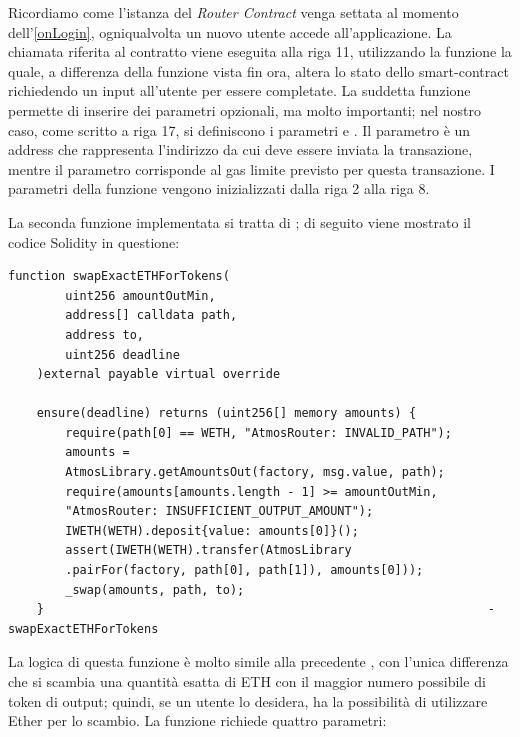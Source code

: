 Ricordiamo come l'istanza del \textit{Router Contract} venga settata al momento dell'\ref{onLogin}, ogniqualvolta un nuovo utente accede all'applicazione. La chiamata riferita al contratto viene eseguita alla riga 11, utilizzando la funzione  la quale, a differenza della funzione  vista fin ora, altera lo stato dello smart-contract richiedendo un input all'utente per essere completate.
La suddetta funzione permette di inserire dei parametri opzionali, ma molto importanti; nel nostro caso, come scritto a riga 17, si definiscono i parametri  e .
Il parametro  è un address che rappresenta l'indirizzo da cui deve essere inviata la transazione, mentre il parametro  corrisponde al gas limite previsto per questa transazione. 
I parametri della funzione  vengono inizializzati dalla riga 2 alla riga 8.


La seconda funzione implementata si tratta di  \textcourier{\ref{swapExactETHForTokens}}; di seguito viene mostrato il codice Solidity in questione:\\

\begin{lstlisting}[caption={[\textcourier{swapExactETHForTokens()} Function]},language=Solidity] 
function swapExactETHForTokens(
        uint256 amountOutMin,
        address[] calldata path,
        address to,
        uint256 deadline
    )external payable virtual override 
    
    ensure(deadline) returns (uint256[] memory amounts) {
        require(path[0] == WETH, "AtmosRouter: INVALID_PATH");
        amounts = 
        AtmosLibrary.getAmountsOut(factory, msg.value, path);
        require(amounts[amounts.length - 1] >= amountOutMin, 
        "AtmosRouter: INSUFFICIENT_OUTPUT_AMOUNT");
        IWETH(WETH).deposit{value: amounts[0]}();
        assert(IWETH(WETH).transfer(AtmosLibrary
        .pairFor(factory, path[0], path[1]), amounts[0]));
        _swap(amounts, path, to);
    }    											        	   -swapExactETHForTokens
\end{lstlisting}\makeatletter{}\makeatother
\label{swapExactETHForTokens}

La logica di questa funzione è molto simile alla precedente , con l'unica differenza che si scambia una quantità esatta di ETH con il maggior numero possibile di token di output; quindi, se un utente lo desidera, ha la possibilità di utilizzare Ether per lo scambio.
La funzione richiede quattro parametri:
 
